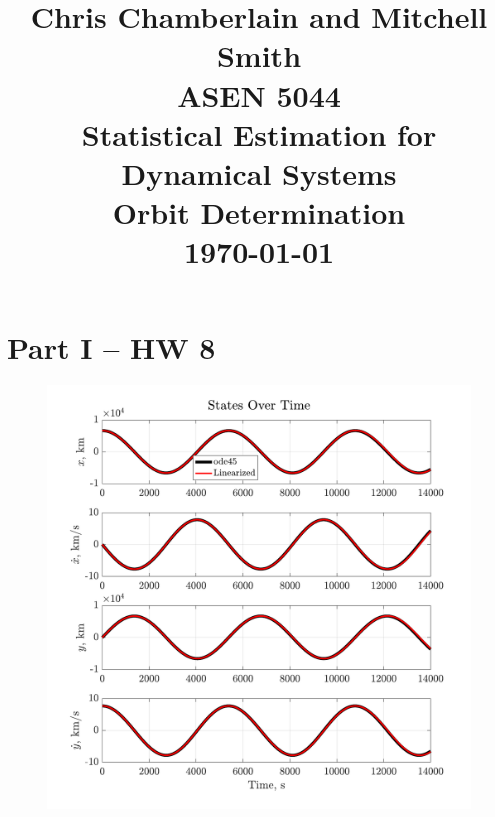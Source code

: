 \documentclass[a4paper]{aiaa-tc}
\title{Chris Chamberlain and Mitchell Smith \\ ASEN 5044  \\ Statistical Estimation for Dynamical Systems \\ Orbit Determination \\ \today}
\begin{document}
    \maketitle

\section*{Part I -- HW 8}
 \begin{figure}[H]
 \centering
 \includegraphics[width=\textwidth]{Figures/Part1_states.pdf}
 \end{figure}
 
\end{document}
